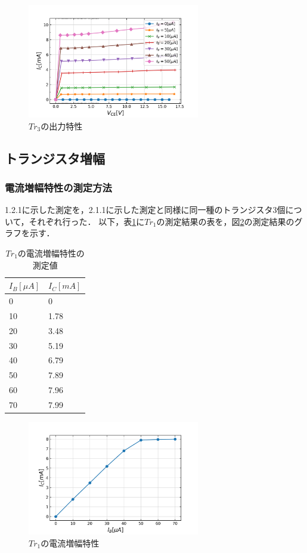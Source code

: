 \documentclass[10pt, a4j, dvipdfmx]{jarticle}
\begin{document}
    \begin{figure}[H]
        \centering
        \includegraphics[height=50mm]{ex-6.png}
        \caption{$Tr_3$の出力特性}
        \label{ex:6}
    \end{figure}

    \newpage
    \subsection{トランジスタ増幅}
    \subsubsection{電流増幅特性の測定方法}
    1.2.1に示した測定を，2.1.1に示した測定と同様に同一種のトランジスタ3個について，それぞれ行った．
    以下，表\ref{tbl:7}に$Tr_1$の測定結果の表を，図\ref{ex:7}の測定結果のグラフを示す．
    \begin{table}[H]
        \centering
        \caption{$Tr_1$の電流増幅特性の測定値}
        \label{tbl:7}
        \small
        \begin{tabular}{|l|l|}
        \hline
        $I_B[\mu A]$ & $I_C[mA]$ \\ \hline
        0            & 0         \\ \hline
        10           & 1.78      \\ \hline
        20           & 3.48      \\ \hline
        30           & 5.19      \\ \hline
        40           & 6.79      \\ \hline
        50           & 7.89      \\ \hline
        60           & 7.96      \\ \hline
        70           & 7.99      \\ \hline
        \end{tabular}
        \normalsize
    \end{table}
    \begin{figure}[H]
        \centering
        \includegraphics[height=50mm]{ex-7.png}
        \caption{$Tr_1$の電流増幅特性}
        \label{ex:7}
    \end{figure}
\end{document}
